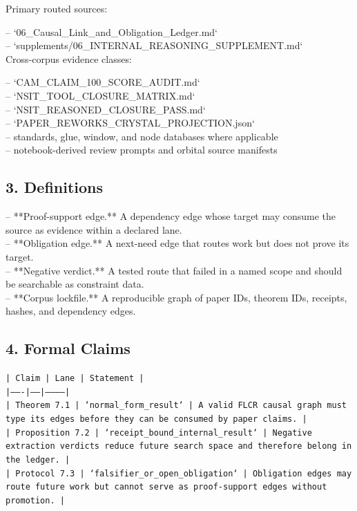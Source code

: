 \documentclass[11pt]{article}
\begin{document}
Primary routed sources:

\noindent{}-- `06\_Causal\_Link\_and\_Obligation\_Ledger.md`\\
\noindent{}-- `supplements/06\_INTERNAL\_REASONING\_SUPPLEMENT.md`\\

Cross-corpus evidence classes:

\noindent{}-- `CAM\_CLAIM\_100\_SCORE\_AUDIT.md`\\
\noindent{}-- `NSIT\_TOOL\_CLOSURE\_MATRIX.md`\\
\noindent{}-- `NSIT\_REASONED\_CLOSURE\_PASS.md`\\
\noindent{}-- `PAPER\_REWORKS\_CRYSTAL\_PROJECTION.json`\\
\noindent{}-- standards, glue, window, and node databases where applicable\\
\noindent{}-- notebook-derived review prompts and orbital source manifests\\

\subsection*{3. Definitions}

\noindent{}-- **Proof-support edge.** A dependency edge whose target may consume the source as evidence within a declared lane.\\
\noindent{}-- **Obligation edge.** A next-need edge that routes work but does not prove its target.\\
\noindent{}-- **Negative verdict.** A tested route that failed in a named scope and should be searchable as constraint data.\\
\noindent{}-- **Corpus lockfile.** A reproducible graph of paper IDs, theorem IDs, receipts, hashes, and dependency edges.\\

\subsection*{4. Formal Claims}

\noindent\texttt{| Claim | Lane | Statement |}\\
\noindent\texttt{|-------|------|-----------|}\\
\noindent\texttt{| Theorem 7.1 | `normal\_form\_result` | A valid FLCR causal graph must type its edges before they can be consumed by paper claims. |}\\
\noindent\texttt{| Proposition 7.2 | `receipt\_bound\_internal\_result` | Negative extraction verdicts reduce future search space and therefore belong in the ledger. |}\\
\noindent\texttt{| Protocol 7.3 | `falsifier\_or\_open\_obligation` | Obligation edges may route future work but cannot serve as proof-support edges without promotion. |}\\
\end{document}
